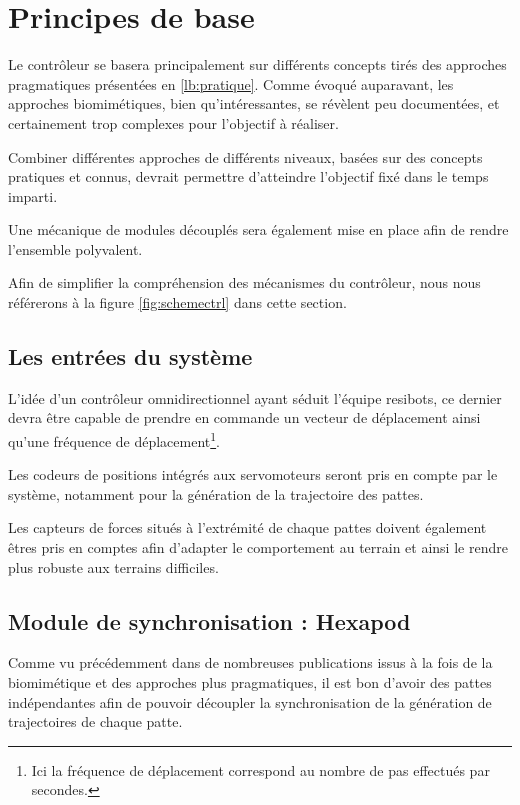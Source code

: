 \documentclass{tnreport}
\begin{document}
\section{Principes de base}
Le contrôleur se basera principalement sur différents concepts tirés des approches pragmatiques présentées en \ref{lb:pratique}. Comme évoqué auparavant, les approches biomimétiques, bien qu'intéressantes, se révèlent peu documentées, et certainement trop complexes pour l'objectif à réaliser. 

Combiner différentes approches de différents niveaux, basées sur des concepts pratiques et connus, devrait permettre d'atteindre l'objectif fixé dans le temps imparti. 

Une mécanique de modules découplés sera également mise en place afin de rendre l'ensemble polyvalent.

Afin de simplifier la compréhension des mécanismes du contrôleur, nous nous référerons à la figure \ref{fig:schemectrl} dans cette section. 
\subsection{Les entrées du système}
L'idée d'un contrôleur omnidirectionnel ayant séduit l'équipe resibots, ce dernier devra être capable de prendre en commande un vecteur de déplacement ainsi qu'une fréquence de déplacement\footnote{Ici la fréquence de déplacement correspond au nombre de pas effectués par secondes.}. 

Les codeurs de positions intégrés aux servomoteurs seront pris en compte par le système, notamment pour la génération de la trajectoire des pattes. 

Les capteurs de forces situés à l'extrémité de chaque pattes doivent également êtres pris en comptes afin d'adapter le comportement au terrain et ainsi le rendre plus robuste aux terrains difficiles.
\subsection{Module de synchronisation : Hexapod}
Comme vu précédemment dans de nombreuses publications issus à la fois de la biomimétique et des approches plus pragmatiques, il est bon d'avoir des pattes indépendantes afin de pouvoir découpler la synchronisation de la génération de trajectoires de chaque patte. 
\end{document}
